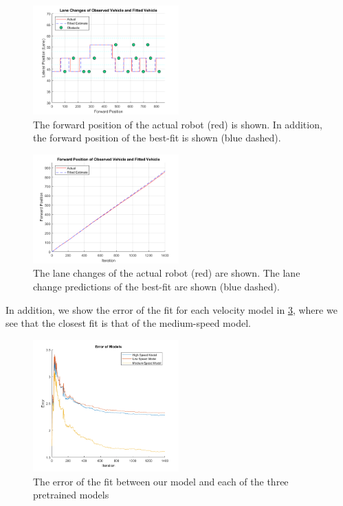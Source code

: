 \documentclass[letterpaper, 10 pt, conference]{ieeeconf}  %
\begin{document}
\begin{figure}[ht]
    \includegraphics[width=0.5\textwidth]{fit2.png}
    \caption{The forward position of the actual robot (red) is shown. In addition, the forward position of the best-fit is shown (blue dashed).}
    \label{fig:fwd}
\end{figure}

\begin{figure}[ht]
    \includegraphics[width=0.5\textwidth]{fit1.png}
    \caption{The lane changes of the actual robot (red) are shown. The lane change predictions of the best-fit are shown (blue dashed).}
    \label{fig:lanchan}
\end{figure}
 In addition, we show the error of the fit for each velocity model in \ref{fig:error}, where we see that the closest fit is that of the medium-speed model.
 
 \begin{figure}[ht]
    \includegraphics[width=0.5\textwidth]{fit3.png}
    \caption{The error of the fit between our model and each of the three pretrained models}
    \label{fig:error}
\end{figure}
 
\end{document}
